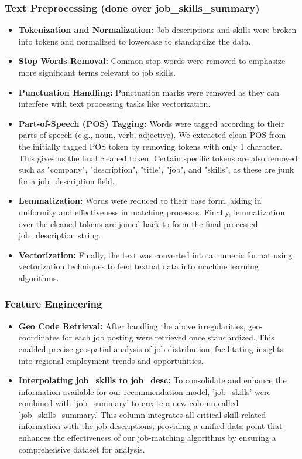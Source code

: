\documentclass[a4paper,10pt]{article}
\begin{document}
    \subsubsection{Text Preprocessing (done over job\_skills\_summary)}
    \begin{itemize}
        \item \textbf{Tokenization and Normalization:} Job descriptions and skills were broken into tokens and normalized to lowercase to standardize the data.
        \item \textbf{Stop Words Removal:} Common stop words were removed to emphasize more significant terms relevant to job skills.
        \item \textbf{Punctuation Handling:} Punctuation marks were removed as they can interfere with text processing tasks like vectorization.
        \item \textbf{Part-of-Speech (POS) Tagging:} Words were tagged according to their parts of speech (e.g., noun, verb, adjective). We extracted clean POS from the initially tagged POS token by removing tokens with only 1 character. This gives us the final cleaned token. Certain specific tokens are also removed such as "company", "description", "title", "job", and "skills", as these are junk for a job\_description field. 
        \item \textbf{Lemmatization:} Words were reduced to their base form, aiding in uniformity and effectiveness in matching processes. Finally, lemmatization over the cleaned tokens are joined back to form the final processed job\_description string.
        \item \textbf{Vectorization:} Finally, the text was converted into a numeric format using vectorization techniques to feed textual data into machine learning algorithms.
    \end{itemize}
    
    \subsubsection{Feature Engineering}
    \begin{itemize}
        \item \textbf{Geo Code Retrieval:} After handling the above irregularities, geo-coordinates for each job posting were retrieved once standardized. This enabled precise geospatial analysis of job distribution, facilitating insights into regional employment trends and opportunities.
        \item \textbf{Interpolating job\_skills to job\_desc:} To consolidate and enhance the information available for our recommendation model, 'job\_skills' were combined with 'job\_summary' to create a new column called 'job\_skills\_summary.' This column integrates all critical skill-related information with the job descriptions, providing a unified data point that enhances the effectiveness of our job-matching algorithms by ensuring a comprehensive dataset for analysis.
    \end{itemize}
    
\end{document}
